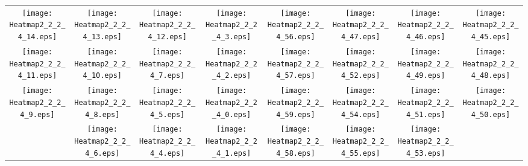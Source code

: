 \documentclass{standalone}
\begin{document}
\begin{tabular}{ *8{c} }
\texttt{[image: Heatmap2\_2\_2\_4\_14.eps]} & \texttt{[image: Heatmap2\_2\_2\_4\_13.eps]} & \texttt{[image: Heatmap2\_2\_2\_4\_12.eps]} & \texttt{[image: Heatmap2\_2\_2\_4\_3.eps]} & \texttt{[image: Heatmap2\_2\_2\_4\_56.eps]} & \texttt{[image: Heatmap2\_2\_2\_4\_47.eps]} & \texttt{[image: Heatmap2\_2\_2\_4\_46.eps]} & \texttt{[image: Heatmap2\_2\_2\_4\_45.eps]} \\
\texttt{[image: Heatmap2\_2\_2\_4\_11.eps]} & \texttt{[image: Heatmap2\_2\_2\_4\_10.eps]} & \texttt{[image: Heatmap2\_2\_2\_4\_7.eps]} & \texttt{[image: Heatmap2\_2\_2\_4\_2.eps]} & \texttt{[image: Heatmap2\_2\_2\_4\_57.eps]} & \texttt{[image: Heatmap2\_2\_2\_4\_52.eps]} & \texttt{[image: Heatmap2\_2\_2\_4\_49.eps]} & \texttt{[image: Heatmap2\_2\_2\_4\_48.eps]} \\
\texttt{[image: Heatmap2\_2\_2\_4\_9.eps]} & \texttt{[image: Heatmap2\_2\_2\_4\_8.eps]} & \texttt{[image: Heatmap2\_2\_2\_4\_5.eps]} & \texttt{[image: Heatmap2\_2\_2\_4\_0.eps]} & \texttt{[image: Heatmap2\_2\_2\_4\_59.eps]} & \texttt{[image: Heatmap2\_2\_2\_4\_54.eps]} & \texttt{[image: Heatmap2\_2\_2\_4\_51.eps]} & \texttt{[image: Heatmap2\_2\_2\_4\_50.eps]} \\
 & \texttt{[image: Heatmap2\_2\_2\_4\_6.eps]} & \texttt{[image: Heatmap2\_2\_2\_4\_4.eps]} & \texttt{[image: Heatmap2\_2\_2\_4\_1.eps]} & \texttt{[image: Heatmap2\_2\_2\_4\_58.eps]} & \texttt{[image: Heatmap2\_2\_2\_4\_55.eps]} & \texttt{[image: Heatmap2\_2\_2\_4\_53.eps]} &  
\end{tabular}
\end{document}
